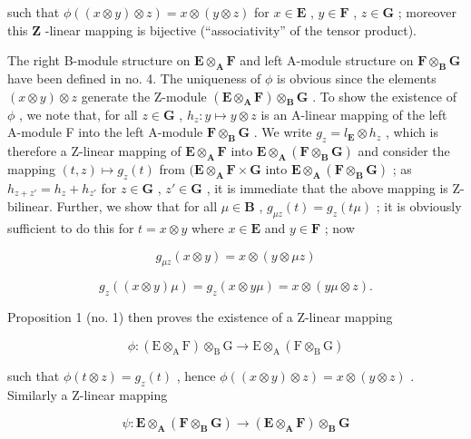 such that \(\phi((x \otimes y) \otimes z) = x \otimes (y \otimes z)\) for \(x \in \mathbf{E}\) , \(y \in \mathbf{F}\) , \(z \in \mathbf{G}\) ; moreover this \(\mathbf{Z}\) -linear mapping is bijective (``associativity'' of the tensor product).

The right B-module structure on \(\mathbf{E} \otimes_{\mathbf{A}} \mathbf{F}\) and left A-module structure on \(\mathbf{F} \otimes_{\mathbf{B}} \mathbf{G}\) have been defined in no. 4. The uniqueness of \(\phi\) is obvious since the elements \((x \otimes y) \otimes z\) generate the Z-module \((\mathbf{E} \otimes_{\mathbf{A}} \mathbf{F}) \otimes_{\mathbf{B}} \mathbf{G}\) . To show the existence of \(\phi\) , we note that, for all \(z \in \mathbf{G}\) , \(h_z: y \mapsto y \otimes z\) is an A-linear mapping of the left A-module F into the left A-module \(\mathbf{F} \otimes_{\mathbf{B}} \mathbf{G}\) . We write \(g_z = l_{\mathbf{E}} \otimes h_z\) , which is therefore a Z-linear mapping of \(\mathbf{E} \otimes_{\mathbf{A}} \mathbf{F}\) into \(\mathbf{E} \otimes_{\mathbf{A}} (\mathbf{F} \otimes_{\mathbf{B}} \mathbf{G})\) and consider the mapping \((t, z) \mapsto g_z(t)\) from \((\mathbf{E} \otimes_{\mathbf{A}} \mathbf{F} \times \mathbf{G}\) into \(\mathbf{E} \otimes_{\mathbf{A}} (\mathbf{F} \otimes_{\mathbf{B}} \mathbf{G})\) ; as \(h_{z+z'} = h_z + h_{z'}\) for \(z \in \mathbf{G}\) , \(z' \in \mathbf{G}\) , it is immediate that the above mapping is Z-bilinear. Further, we show that for all \(\mu \in \mathbf{B}\) , \(g_{\mu z}(t) = g_z(t\mu)\) ; it is obviously sufficient to do this for \(t = x \otimes y\) where \(x \in \mathbf{E}\) and \(y \in \mathbf{F}\) ; now

\[
g _ {\mu z} (x \otimes y) = x \otimes (y \otimes \mu z)
\]

\[
g _ {z} ((x \otimes y) \mu) = g _ {z} (x \otimes y \mu) = x \otimes (y \mu \otimes z).
\]

Proposition 1 (no. 1) then proves the existence of a Z-linear mapping

\[
\phi : (\mathrm{E} \otimes_ {\mathrm{A}} \mathrm{F}) \otimes_ {\mathrm{B}} \mathrm{G} \rightarrow \mathrm{E} \otimes_ {\mathrm{A}} (\mathrm{F} \otimes_ {\mathrm{B}} \mathrm{G})
\]

such that \(\phi(t \otimes z) = g_z(t)\) , hence \(\phi((x \otimes y) \otimes z) = x \otimes (y \otimes z)\) . Similarly a Z-linear mapping

\[
\psi : \mathbf {E} \otimes_ {\mathbf {A}} (\mathbf {F} \otimes_ {\mathbf {B}} \mathbf {G}) \rightarrow (\mathbf {E} \otimes_ {\mathbf {A}} \mathbf {F}) \otimes_ {\mathbf {B}} \mathbf {G}
\]

